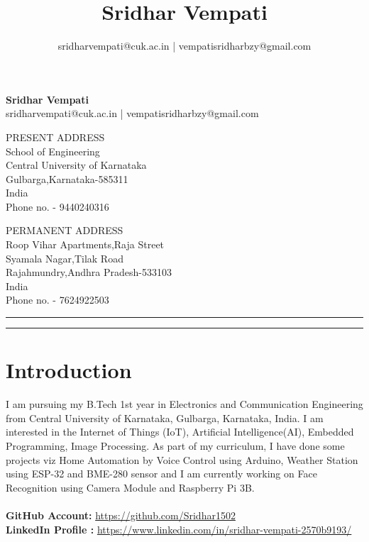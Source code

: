\documentclass[]{article}
\title{Sridhar Vempati}
\author{sridharvempati@cuk.ac.in | vempatisridharbzy@gmail.com}
\begin{document}
    \begin{center}
        \Huge \textbf{Sridhar Vempati}\\
        \large sridharvempati@cuk.ac.in | vempatisridharbzy@gmail.com\\ 
    \end{center}
    \begin{multicols}{2}[]
        \begin{flushleft}
            PRESENT ADDRESS\\School of Engineering\\Central University of Karnataka\\Gulbarga,Karnataka-585311\\India\\Phone no. - 9440240316
        \end{flushleft}
        \begin{flushright}
            PERMANENT ADDRESS\\Roop Vihar Apartments,Raja Street\\Syamala Nagar,Tilak Road\\Rajahmundry,Andhra Pradesh-533103\\India\\Phone no. - 7624922503
        \end{flushright}
    \end{multicols}  
    \begin{spacing}{0.05} %
    \noindent
    \rule{\linewidth}{2pt}  
    \rule{\linewidth}{1pt}  
    \end{spacing}
    \section*{Introduction}
    I am pursuing my B.Tech 1st year in Electronics and Communication Engineering from Central University of Karnataka, Gulbarga, Karnataka, India.
    I am interested in the Internet of Things (IoT), Artificial Intelligence(AI), Embedded Programming, Image Processing.
    As part of my curriculum, I have done some projects viz Home Automation by Voice Control using Arduino, Weather Station using ESP-32 and BME-280 sensor and I am currently working on Face Recognition using Camera Module and Raspberry Pi 3B.\\
    \\ \textbf{GitHub Account:} \url{https://github.com/Sridhar1502}
    \\ \textbf{LinkedIn Profile :} \url{https://www.linkedin.com/in/sridhar-vempati-2570b9193/}
\end{document}

